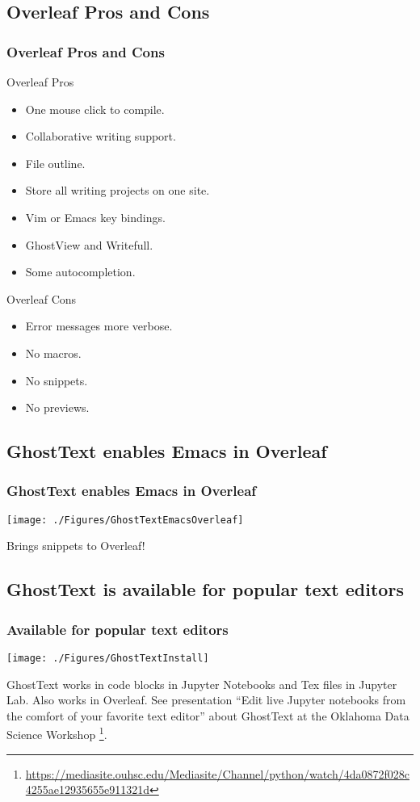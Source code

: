 \documentclass{beamer}
\begin{document}
\subsection{Overleaf Pros and Cons}
\begin{frame}
\frametitle{Overleaf Pros and Cons}
\begin{Large}
\begin{center}
Overleaf Pros
\begin{itemize}[font=$\bullet$\scshape\bfseries]
\item One mouse click to compile.
\item Collaborative writing support.
\item File outline.
\item Store all writing projects on one site.
\item Vim or Emacs key bindings.
\item GhostView and Writefull.
\item Some autocompletion.
\end{itemize}
Overleaf Cons
\begin{itemize}[font=$\bullet$\scshape\bfseries]
\item Error messages more verbose.
\item No macros.
\item No snippets.
\item No previews.
\end{itemize}
\end{center}
\end{Large}
\end{frame}
\note{}


\subsection{GhostText enables Emacs in Overleaf}
\begin{frame}
\frametitle{GhostText enables Emacs in Overleaf}
\begin{center}
    \texttt{[image: ./Figures/GhostTextEmacsOverleaf]}
\end{center}
Brings snippets to Overleaf!
\end{frame}


\subsection{GhostText is available for popular text editors}
\begin{frame}
\frametitle{Available for popular text editors}
\begin{center}
    \texttt{[image: ./Figures/GhostTextInstall]}
\end{center}
GhostText works in code blocks in Jupyter Notebooks and Tex files in Jupyter Lab. Also works in Overleaf. See presentation ``Edit live Jupyter notebooks from the comfort of your favorite text editor'' about GhostText at the Oklahoma Data Science Workshop  \footnote{\url{https://mediasite.ouhsc.edu/Mediasite/Channel/python/watch/4da0872f028c4255ae12935655e911321d}}.
\end{frame}
\end{document}
